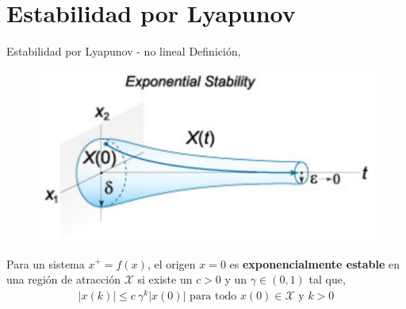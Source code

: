 \documentclass[8pt]{beamer}
\begin{document}
\section{Estabilidad por Lyapunov}
\begin{frame}[fragile]{Estabilidad por Lyapunov - no lineal}
	Definición,
	\begin{figure}[!ht]
		\centering
		\includegraphics[width=0.6\linewidth]{figures/Lyapunov}	
	\end{figure}
	Para un sistema $x^+=f(x)$, el origen $x=0$ es \textbf{exponencialmente estable} en una región de atracción $\mathcal{X}$ si existe un $c>0$ y un $\gamma\in (0,1)$ tal que,
	\begin{align*}
	|x(k)|\leq c~\gamma^k |x(0)| \text{ para todo } x(0)\in \mathcal{X} \text{ y } k>0
	\end{align*}
	
\end{frame}
\end{document}
